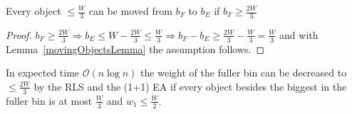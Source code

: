 \begin{corollary}\label{movingObjectsCorollary}
    Every object \(\le \frac{W}{3}\) can be moved from $b_F$ to $b_E$ if \(b_F \ge \frac{2W}{3}\)
\end{corollary}
\begin{proof}
    \(b_F \ge \frac{2W}{3} \Rightarrow b_E \le W - \frac{2W}{3} \le \frac{W}{3} \Rightarrow b_F - b_E \ge \frac{2W}{3} - \frac{W}{3} = \frac{W}{3}\) and with Lemma~\ref{movingObjectsLemma} the assumption follows.
\end{proof}

\begin{lemma}\label{movingObjectsLemma2}
    In expected time $\mathcal{O}(n\log{}n)$ the weight of the fuller bin can be decreased to \(\le \frac{2W}{3}\) by the RLS and the (1+1) EA if every object besides the biggest in the fuller bin is at most $\frac{W}{3}$ and \(w_1 \le \frac{W}{2}\).
\end{lemma}
